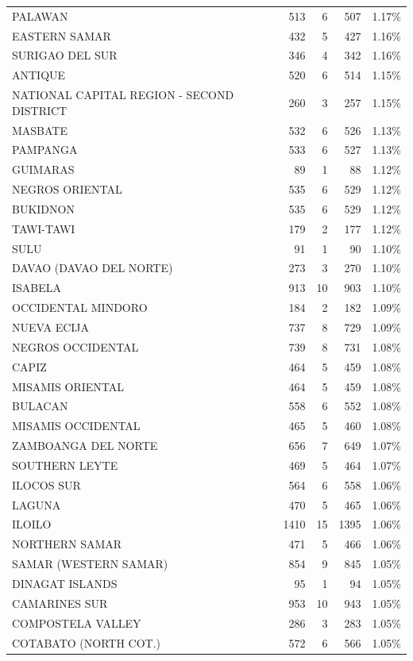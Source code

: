\begin{tabular}{lrrrr}
PALAWAN & 513 & 6 & 507 & 1.17\% \\
EASTERN SAMAR & 432 & 5 & 427 & 1.16\% \\
SURIGAO DEL SUR & 346 & 4 & 342 & 1.16\% \\
ANTIQUE & 520 & 6 & 514 & 1.15\% \\
NATIONAL CAPITAL REGION - SECOND DISTRICT & 260 & 3 & 257 & 1.15\% \\
MASBATE & 532 & 6 & 526 & 1.13\% \\
PAMPANGA & 533 & 6 & 527 & 1.13\% \\
GUIMARAS & 89 & 1 & 88 & 1.12\% \\
NEGROS ORIENTAL & 535 & 6 & 529 & 1.12\% \\
BUKIDNON & 535 & 6 & 529 & 1.12\% \\
TAWI-TAWI & 179 & 2 & 177 & 1.12\% \\
SULU & 91 & 1 & 90 & 1.10\% \\
DAVAO (DAVAO DEL NORTE) & 273 & 3 & 270 & 1.10\% \\
ISABELA & 913 & 10 & 903 & 1.10\% \\
OCCIDENTAL MINDORO & 184 & 2 & 182 & 1.09\% \\
NUEVA ECIJA & 737 & 8 & 729 & 1.09\% \\
NEGROS OCCIDENTAL & 739 & 8 & 731 & 1.08\% \\
CAPIZ & 464 & 5 & 459 & 1.08\% \\
MISAMIS ORIENTAL & 464 & 5 & 459 & 1.08\% \\
BULACAN & 558 & 6 & 552 & 1.08\% \\
MISAMIS OCCIDENTAL & 465 & 5 & 460 & 1.08\% \\
ZAMBOANGA DEL NORTE & 656 & 7 & 649 & 1.07\% \\
SOUTHERN LEYTE & 469 & 5 & 464 & 1.07\% \\
ILOCOS SUR & 564 & 6 & 558 & 1.06\% \\
LAGUNA & 470 & 5 & 465 & 1.06\% \\
ILOILO & 1410 & 15 & 1395 & 1.06\% \\
NORTHERN SAMAR & 471 & 5 & 466 & 1.06\% \\
SAMAR (WESTERN SAMAR) & 854 & 9 & 845 & 1.05\% \\
DINAGAT ISLANDS & 95 & 1 & 94 & 1.05\% \\
CAMARINES SUR & 953 & 10 & 943 & 1.05\% \\
COMPOSTELA VALLEY & 286 & 3 & 283 & 1.05\% \\
COTABATO (NORTH COT.) & 572 & 6 & 566 & 1.05\% \\

\end{tabular}
